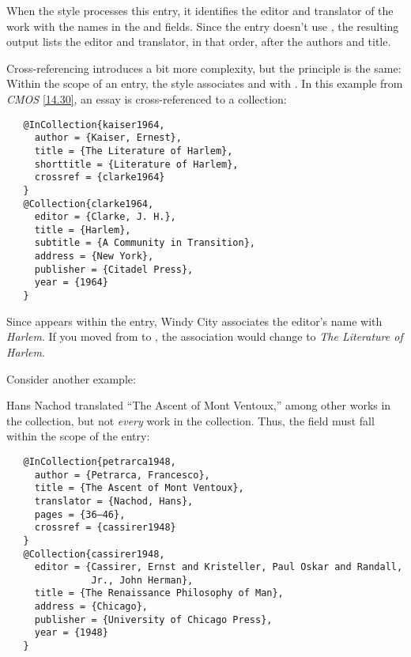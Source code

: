 \documentclass[11pt,letterpaper,oneside]{article}
\begin{document}
\begin{citebib}
\item \cite{adorno1999}
\end{citebib}

\noindent When the style processes this entry, it identifies the
editor and translator of the work with the names in the
 and  fields. Since the entry
doesn't use , the resulting output lists the editor and
translator, in that order, after the authors and title.

Cross-referencing introduces a bit more complexity, but the principle
is the same: Within the scope of an entry, the style associates
 and  with . In
this example from \textit{CMOS} \ref{14.30}, an essay is
cross-referenced to a collection:

\begin{verbatim}
   @InCollection{kaiser1964,
     author = {Kaiser, Ernest},
     title = {The Literature of Harlem},
     shorttitle = {Literature of Harlem},
     crossref = {clarke1964}
   }
   @Collection{clarke1964,
     editor = {Clarke, J. H.},
     title = {Harlem},
     subtitle = {A Community in Transition},
     address = {New York},
     publisher = {Citadel Press},
     year = {1964}
   }
\end{verbatim}

\begin{citebib}
\item \cite{kaiser1964}
\end{citebib}

\noindent Since  appears within the
 entry, Windy City associates the editor's name
with \textit{Harlem}. If you moved  from
 to , the association would
change to \textit{The Literature of Harlem}.

Consider another example:

\begin{citebib}
\item \cite{petrarca1948}
\end{citebib}

\noindent Hans Nachod translated ``The Ascent of Mont Ventoux,'' among
other works in the collection, but not \textit{every} work in the
collection. Thus, the  field must fall within the
scope of the  entry:

\begin{verbatim}
   @InCollection{petrarca1948,
     author = {Petrarca, Francesco},
     title = {The Ascent of Mont Ventoux},
     translator = {Nachod, Hans},
     pages = {36–46},
     crossref = {cassirer1948}
   }
   @Collection{cassirer1948,
     editor = {Cassirer, Ernst and Kristeller, Paul Oskar and Randall,
               Jr., John Herman},
     title = {The Renaissance Philosophy of Man},
     address = {Chicago},
     publisher = {University of Chicago Press},
     year = {1948}
   }
\end{verbatim}
\end{document}
